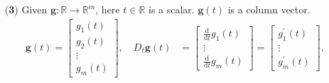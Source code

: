 \documentclass[12pt,thmsa]{article}
\begin{document}
\begin{itemize}
	\item[({\bf{3}})] Given \(\boldsymbol{g}: \mathbb{R} \rightarrow \mathbb{R}^m \), here \(t \in \mathbb{R} \) is a scalar. \(\boldsymbol{g}(t)\) is a column vector.
	\[
	\begin{aligned}
		\boldsymbol{g}(t) =
		\left[
		\begin{array}{c}
			g_{1}(t) \\
			g_{2}(t) \\
			\vdots \\
			g_{m}(t)
		\end{array}
		\right], \quad
		D_{t} \boldsymbol{g}(t) & =\left[
		\begin{aligned}
			\frac{\mathrm{d}}{\mathrm{d} t}g_{1}(t) \\
			\vdots \qquad \\
			\frac{\mathrm{d}}{\mathrm{d} t}g_{m}(t)
		\end{aligned}
		\right] =\left[\begin{array}{c}
			g_{1}^{\prime}(t) \\
			\vdots \\
			g_{m}^{\prime}(t)
		\end{array}\right],  \\
	\end{aligned}
	\]


\end{itemize}
\end{document}
